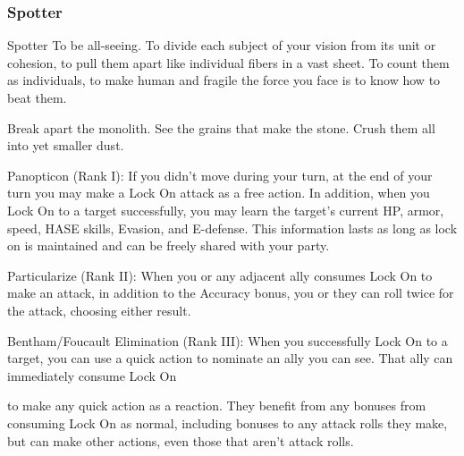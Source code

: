 \subsubsection{Spotter}

                                                      Spotter
To be all-seeing. To divide each subject of your vision from its unit or cohesion, to pull them apart
like individual fibers in a vast sheet. To count them as individuals, to make human and fragile the
force you face is to know how to beat them.

Break apart the monolith. See the grains that make the stone. Crush them all into yet smaller
dust.


Panopticon (Rank I): If you didn’t move during your turn, at the end of your turn you may make
a Lock On attack as a free action. In addition, when you Lock On to a target successfully, you
may learn the target’s current HP, armor, speed, HASE skills, Evasion, and E-defense. This
information lasts as long as lock on is maintained and can be freely shared with your party.

Particularize (Rank II): When you or any adjacent ally consumes Lock On to make an attack, in
addition to the Accuracy bonus, you or they can roll twice for the attack, choosing either result.

Bentham/Foucault Elimination (Rank III): When you successfully Lock On to a target, you can
use a quick action to nominate an ally you can see. That ally can immediately consume Lock On




to make any quick action as a reaction. They benefit from any bonuses from consuming Lock On
as normal, including bonuses to any attack rolls they make, but can make other actions, even
those that aren’t attack rolls.